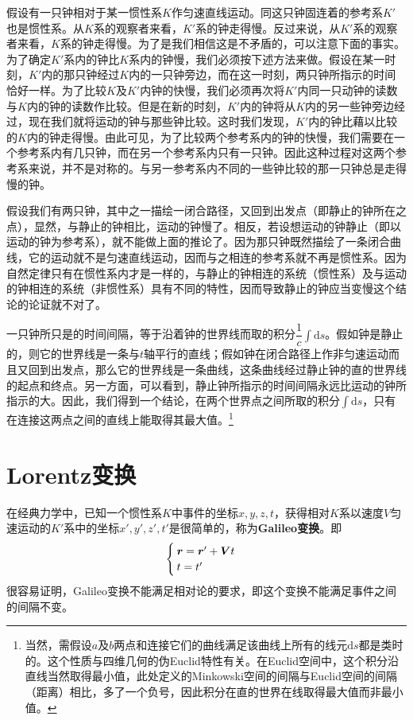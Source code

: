 假设有一只钟相对于某一惯性系$K$作匀速直线运动。同这只钟固连着的参考系$K'$也是惯性系。从$K$系的观察者来看，$K'$系的钟走得慢。反过来说，从$K'$系的观察者来看，$K$系的钟走得慢。为了是我们相信这是不矛盾的，可以注意下面的事实。为了确定$K'$系内的钟比$K$系内的钟慢，我们必须按下述方法来做。假设在某一时刻，$K'$内的那只钟经过$K$内的一只钟旁边，而在这一时刻，两只钟所指示的时间恰好一样。为了比较$K$及$K'$内钟的快慢，我们必须再次将$K'$内同一只动钟的读数与$K$内的钟的读数作比较。但是在新的时刻，$K'$内的钟将从$K$内的另一些钟旁边经过，现在我们就将运动的钟与那些钟比较。这时我们发现，$K'$内的钟比藉以比较的$K$内的钟走得慢。由此可见，为了比较两个参考系内的钟的快慢，我们需要在一个参考系内有几只钟，而在另一个参考系内只有一只钟。因此这种过程对这两个参考系来说，并不是对称的。与另一参考系内不同的一些钟比较的那一只钟总是走得慢的钟。

假设我们有两只钟，其中之一描绘一闭合路径，又回到出发点（即静止的钟所在之点），显然，与静止的钟相比，运动的钟慢了。相反，若设想运动的钟静止（即以运动的钟为参考系），就不能做上面的推论了。因为那只钟既然描绘了一条闭合曲线，它的运动就不是匀速直线运动，因而与之相连的参考系就不再是惯性系。因为自然定律只有在惯性系内才是一样的，与静止的钟相连的系统（惯性系）及与运动的钟相连的系统（非惯性系）具有不同的特性，因而导致静止的钟应当变慢这个结论的论证就不对了。

一只钟所只是的时间间隔，等于沿着钟的世界线而取的积分$\displaystyle \dfrac{1}{c}\int\mathrm{d}s$。假如钟是静止的，则它的世界线是一条与$t$轴平行的直线；假如钟在闭合路径上作非匀速运动而且又回到出发点，那么它的世界线是一条曲线，这条曲线经过静止钟的直的世界线的起点和终点。另一方面，可以看到，静止钟所指示的时间间隔永远比运动的钟所指示的大。因此，我们得到一个结论，在两个世界点之间所取的积分$\displaystyle \int\mathrm{d}s$，只有在连接这两点之间的直线上能取得其最大值。\footnote{当然，需假设$a$及$b$两点和连接它们的曲线满足该曲线上所有的线元$\mathrm{d}s$都是类时的。这个性质与四维几何的伪Euclid特性有关。在Euclid空间中，这个积分沿直线当然取得最小值，此处定义的Minkowski空间的间隔与Euclid空间的间隔（距离）相比，多了一个负号，因此积分在直的世界在线取得最大值而非最小值。}

\section{Lorentz变换}

在经典力学中，已知一个惯性系$K$中事件的坐标$x,y,z,t$，获得相对$K$系以速度$V$匀速运动的$K'$系中的坐标$x',y',z',t'$是很简单的，称为{\bf Galileo变换}。即
\begin{equation}
\begin{cases}
	\boldsymbol{r} = \boldsymbol{r}'+\boldsymbol{V}t \\
	t = t'
\end{cases}
\end{equation}
很容易证明，Galileo变换不能满足相对论的要求，即这个变换不能满足事件之间的间隔不变。

